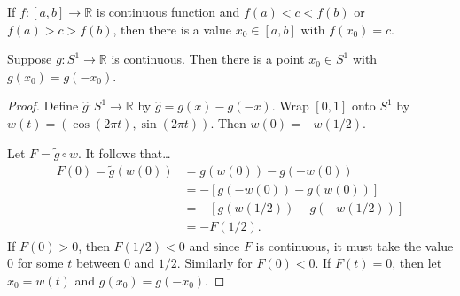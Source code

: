 \begin{theorem}
If $f:[a,b] \rightarrow \mathbb{R}$ is continuous function and $f(a) < c < f(b)$ or $f(a) > c > f(b)$, then there is a value $x_0 \in [a,b]$ with $f(x_0) = c$.
\end{theorem}

\begin{corollary}
Suppose $g : S^1 \rightarrow \mathbb{R}$ is continuous. Then there is a point $x_0 \in S^1$ with $g(x_0) = g(-x_0)$.
\end{corollary}

\begin{proof}
Define $\hat{g} : S^1 \rightarrow \mathbb{R}$ by $\hat{g} = g(x) - g(-x)$. Wrap $[0,1]$ onto $S^1$ by $w(t) = (\cos (2 \pi t), \sin (2 \pi t)).$ Then
$w(0) = -w(1/2).$

Let $F = \tilde g \circ w$. It follows that\dots
\begin{align*}
F(0) = \tilde g(w(0)) &= g(w(0)) - g(-w(0))\\
                    &= -[g(-w(0)) - g(w(0))]\\
                    &= -[g(w(1/2)) - g(-w(1/2))]\\
                    &=-F(1/2).
\end{align*}
If $F(0) > 0$, then $F(1/2) < 0$ and since $F$ is continuous, it must take the value $0$ for some $t$ between $0$ and $1/2$. Similarly for $F(0) < 0$.
If $F(t) = 0$, then let $x_0 = w(t)$ and $g(x_0) = g(-x_0)$.
\end{proof}